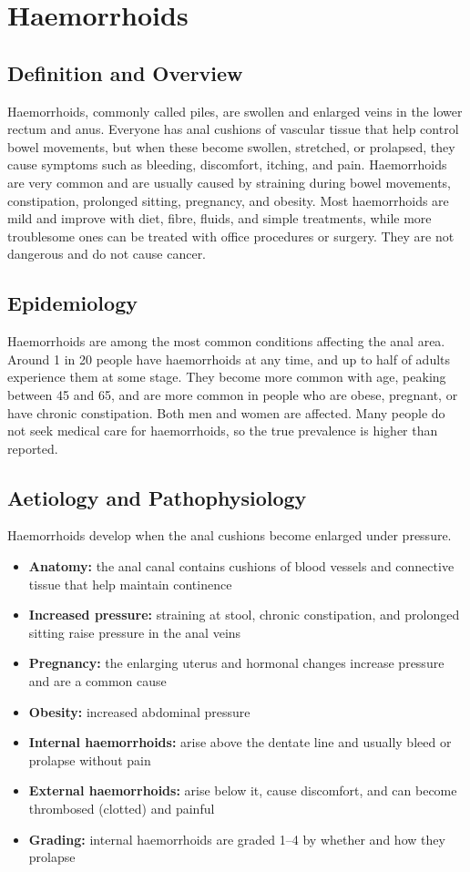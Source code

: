 \chapter{Haemorrhoids}

\section*{Definition and Overview}
Haemorrhoids, commonly called piles, are swollen and enlarged veins in the lower rectum and anus. Everyone has anal cushions of vascular tissue that help control bowel movements, but when these become swollen, stretched, or prolapsed, they cause symptoms such as bleeding, discomfort, itching, and pain. Haemorrhoids are very common and are usually caused by straining during bowel movements, constipation, prolonged sitting, pregnancy, and obesity. Most haemorrhoids are mild and improve with diet, fibre, fluids, and simple treatments, while more troublesome ones can be treated with office procedures or surgery. They are not dangerous and do not cause cancer.

\section*{Epidemiology}
Haemorrhoids are among the most common conditions affecting the anal area. Around 1 in 20 people have haemorrhoids at any time, and up to half of adults experience them at some stage. They become more common with age, peaking between 45 and 65, and are more common in people who are obese, pregnant, or have chronic constipation. Both men and women are affected. Many people do not seek medical care for haemorrhoids, so the true prevalence is higher than reported.

\section*{Aetiology and Pathophysiology}
Haemorrhoids develop when the anal cushions become enlarged under pressure.

\begin{itemize}
    \item \textbf{Anatomy:} the anal canal contains cushions of blood vessels and connective tissue that help maintain continence
    \item \textbf{Increased pressure:} straining at stool, chronic constipation, and prolonged sitting raise pressure in the anal veins
    \item \textbf{Pregnancy:} the enlarging uterus and hormonal changes increase pressure and are a common cause
    \item \textbf{Obesity:} increased abdominal pressure
    \item \textbf{Internal haemorrhoids:} arise above the dentate line and usually bleed or prolapse without pain
    \item \textbf{External haemorrhoids:} arise below it, cause discomfort, and can become thrombosed (clotted) and painful
    \item \textbf{Grading:} internal haemorrhoids are graded 1--4 by whether and how they prolapse
\end{itemize}

